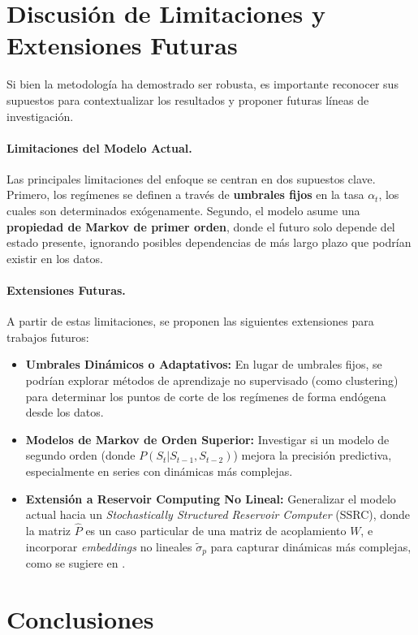 \section{Discusión de Limitaciones y Extensiones Futuras}

Si bien la metodología ha demostrado ser robusta, es importante reconocer sus supuestos para contextualizar los resultados y proponer futuras líneas de investigación.

\paragraph{Limitaciones del Modelo Actual.}
Las principales limitaciones del enfoque se centran en dos supuestos clave. Primero, los regímenes se definen a través de \textbf{umbrales fijos} en la tasa \(\alpha_t\), los cuales son determinados exógenamente. Segundo, el modelo asume una \textbf{propiedad de Markov de primer orden}, donde el futuro solo depende del estado presente, ignorando posibles dependencias de más largo plazo que podrían existir en los datos.

\paragraph{Extensiones Futuras.}
A partir de estas limitaciones, se proponen las siguientes extensiones para trabajos futuros:
\begin{itemize}
    \item \textbf{Umbrales Dinámicos o Adaptativos:} En lugar de umbrales fijos, se podrían explorar métodos de aprendizaje no supervisado (como clustering) para determinar los puntos de corte de los regímenes de forma endógena desde los datos.
    \item \textbf{Modelos de Markov de Orden Superior:} Investigar si un modelo de segundo orden (donde \(P(S_t | S_{t-1}, S_{t-2})\)) mejora la precisión predictiva, especialmente en series con dinámicas más complejas.
    \item \textbf{Extensión a Reservoir Computing No Lineal:} Generalizar el modelo actual hacia un \textit{Stochastically Structured Reservoir Computer} (SSRC), donde la matriz \(\hat{P}\) es un caso particular de una matriz de acoplamiento \(W\), e incorporar \textit{embeddings} no lineales \(\tilde{\sigma}_p\) para capturar dinámicas más complejas, como se sugiere en \cite{BanegasVides2025}.

\end{itemize}

\section{Conclusiones}

